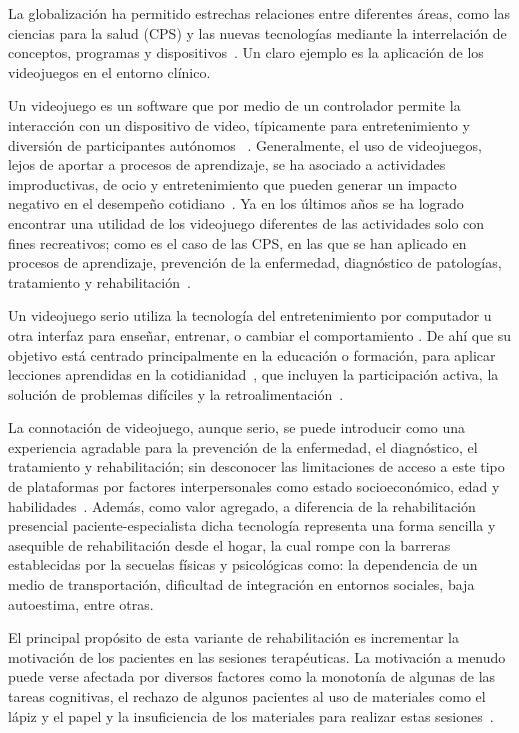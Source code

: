 \begin{introduction}
    La globalización ha permitido estrechas relaciones entre diferentes áreas, como las ciencias para la salud (CPS) y las nuevas tecnologías mediante la interrelación de conceptos, programas y dispositivos~\cite{federal2008older}. Un claro ejemplo es la aplicación de los videojuegos en el entorno clínico. 
    
    Un videojuego es un software que por medio de un controlador permite la interacción con un dispositivo de video, típicamente para entretenimiento y diversión de participantes autónomos ~\cite{studenski2010interactive,gomez2012videojuegos, gonzalez2016mooc}. Generalmente, el uso de videojuegos, lejos de aportar a procesos de aprendizaje, se ha asociado a actividades improductivas, de ocio y entretenimiento que pueden generar un impacto negativo en el desempeño cotidiano~\cite{maldonado2014videojuegos}. Ya en los últimos años se ha logrado encontrar una utilidad de los videojuego diferentes de las actividades solo con fines recreativos; como es el caso de las CPS, en las que se han aplicado en procesos de aprendizaje, prevención de la enfermedad, diagnóstico de patologías, tratamiento y rehabilitación~\cite{ladino2021uso}. 

    Un videojuego serio utiliza la tecnología del entretenimiento por computador u otra interfaz para enseñar, entrenar, o cambiar el comportamiento . De ahí que su objetivo está centrado principalmente en la educación o formación, para aplicar lecciones aprendidas en la cotidianidad~\cite{graafland2014serious}, que incluyen la participación activa, la solución de problemas difíciles y la retroalimentación~\cite{gee2004learning}.
    
    La connotación de videojuego, aunque serio, se puede introducir como una experiencia agradable para la prevención de la enfermedad, el diagnóstico, el tratamiento y rehabilitación; sin desconocer las limitaciones de acceso a este tipo de plataformas por factores interpersonales como estado socioeconómico, edad y habilidades~\cite{ladino2021uso}. Además, como valor agregado, a diferencia de la rehabilitación presencial paciente-especialista dicha tecnología representa una forma sencilla y asequible de rehabilitación desde el hogar, la cual rompe con la barreras establecidas por la secuelas físicas y psicológicas como: la dependencia de un medio de transportación, dificultad de integración en entornos sociales, baja autoestima, entre otras.

    El principal propósito de esta variante de rehabilitación es incrementar la motivación de los pacientes en las sesiones terapéuticas. La motivación a menudo puede verse afectada por diversos factores como la monotonía de algunas de las tareas cognitivas, el rechazo de algunos pacientes al uso de materiales como el lápiz y el papel y la insuficiencia de los materiales para realizar estas sesiones~\cite{regalon12019juegos}. 


\end{introduction}
